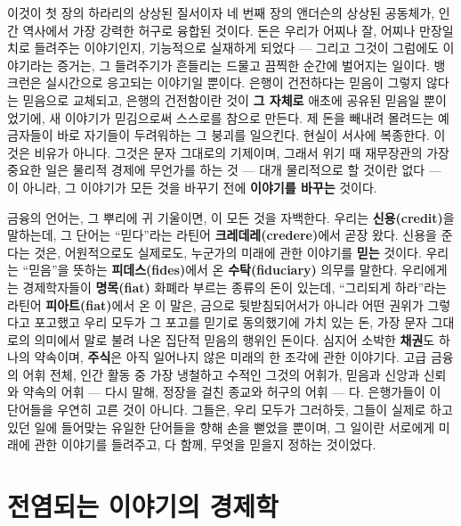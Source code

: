 이것이 첫 장의 하라리의 상상된 질서이자 네 번째 장의 앤더슨의 상상된 공동체가, 인간 역사에서 가장 강력한 허구로 융합된 것이다. 돈은 우리가 어찌나 잘, 어찌나 만장일치로 들려주는 이야기인지, 기능적으로 실재하게 되었다 — 그리고 그것이 그럼에도 이야기라는 증거는, 그 들려주기가 흔들리는 드물고 끔찍한 순간에 벌어지는 일이다. 뱅크런은 실시간으로 응고되는 이야기일 뿐이다. 은행이 건전하다는 믿음이 그렇지 않다는 믿음으로 교체되고, 은행의 건전함이란 것이 \textbf{그 자체로} 애초에 공유된 믿음일 뿐이었기에, 새 이야기가 믿김으로써 스스로를 참으로 만든다. 제 돈을 빼내려 몰려드는 예금자들이 바로 자기들이 두려워하는 그 붕괴를 일으킨다. 현실이 서사에 복종한다. 이것은 비유가 아니다. 그것은 문자 그대로의 기제이며, 그래서 위기 때 재무장관의 가장 중요한 일은 물리적 경제에 무언가를 하는 것 — 대개 물리적으로 할 것이란 없다 — 이 아니라, 그 이야기가 모든 것을 바꾸기 전에 \textbf{이야기를 바꾸는} 것이다.

금융의 언어는, 그 뿌리에 귀 기울이면, 이 모든 것을 자백한다. 우리는 \textbf{신용(credit)}을 말하는데, 그 단어는 ``믿다''라는 라틴어 \textbf{크레데레(credere)}에서 곧장 왔다. 신용을 준다는 것은, 어원적으로도 실제로도, 누군가의 미래에 관한 이야기를 \textbf{믿는} 것이다. 우리는 ``믿음''을 뜻하는 \textbf{피데스(fides)}에서 온 \textbf{수탁(fiduciary)} 의무를 말한다. 우리에게는 경제학자들이 \textbf{명목(fiat)} 화폐라 부르는 종류의 돈이 있는데, ``그리되게 하라''라는 라틴어 \textbf{피아트(fiat)}에서 온 이 말은, 금으로 뒷받침되어서가 아니라 어떤 권위가 그렇다고 포고했고 우리 모두가 그 포고를 믿기로 동의했기에 가치 있는 돈, 가장 문자 그대로의 의미에서 말로 불려 나온 집단적 믿음의 행위인 돈이다. 심지어 소박한 \textbf{채권}도 하나의 약속이며, \textbf{주식}은 아직 일어나지 않은 미래의 한 조각에 관한 이야기다. 고급 금융의 어휘 전체, 인간 활동 중 가장 냉철하고 수적인 그것의 어휘가, 믿음과 신앙과 신뢰와 약속의 어휘 — 다시 말해, 정장을 걸친 종교와 허구의 어휘 — 다. 은행가들이 이 단어들을 우연히 고른 것이 아니다. 그들은, 우리 모두가 그러하듯, 그들이 실제로 하고 있던 일에 들어맞는 유일한 단어들을 향해 손을 뻗었을 뿐이며, 그 일이란 서로에게 미래에 관한 이야기를 들려주고, 다 함께, 무엇을 믿을지 정하는 것이었다.

\section*{전염되는 이야기의 경제학}

